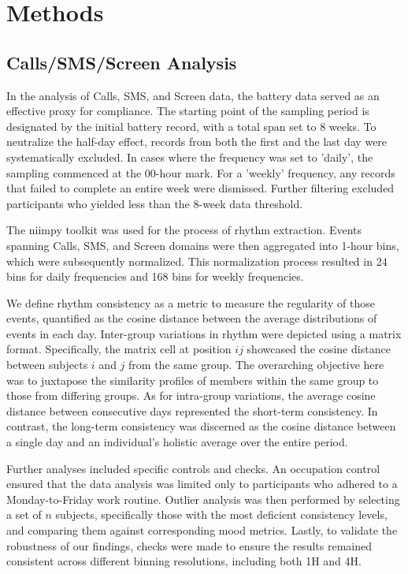 \documentclass[journal, onecolumn, 11pt]{IEEEtran}
\begin{document}
        
\section{Methods}

\subsection{Calls/SMS/Screen Analysis}

In the analysis of Calls, SMS, and Screen data, the battery data served as an effective proxy for compliance. The starting point of the sampling period is designated by the initial battery record, with a total span set to 8 weeks. To neutralize the half-day effect, records from both the first and the last day were systematically excluded. In cases where the frequency was set to 'daily', the sampling commenced at the 00-hour mark. For a 'weekly' frequency, any records that failed to complete an entire week were dismissed. Further filtering excluded participants who yielded less than the 8-week data threshold.

The niimpy toolkit was used for the process of rhythm extraction. Events spanning Calls, SMS, and Screen domains were then aggregated into 1-hour bins, which were subsequently normalized. This normalization process resulted in 24 bins for daily frequencies and 168 bins for weekly frequencies.

We define rhythm consistency as a metric to measure the regularity of those events, quantified as the cosine distance between the average distributions of events in each day. Inter-group variations in rhythm were depicted using a matrix format. Specifically, the matrix cell at position ${ij}$ showcased the cosine distance between subjects $i$ and $j$ from the same group. The overarching objective here was to juxtapose the similarity profiles of members within the same group to those from differing groups. As for intra-group variations, the average cosine distance between consecutive days represented the short-term consistency. In contrast, the long-term consistency was discerned as the cosine distance between a single day and an individual's holistic average over the entire period.

Further analyses included specific controls and checks. An occupation control ensured that the data analysis was limited only to participants who adhered to a Monday-to-Friday work routine. Outlier analysis was then performed by selecting a set of $n$ subjects, specifically those with the most deficient consistency levels, and comparing them against corresponding mood metrics. Lastly, to validate the robustness of our findings, checks were made to ensure the results remained consistent across different binning resolutions, including both 1H and 4H.
\end{document}

